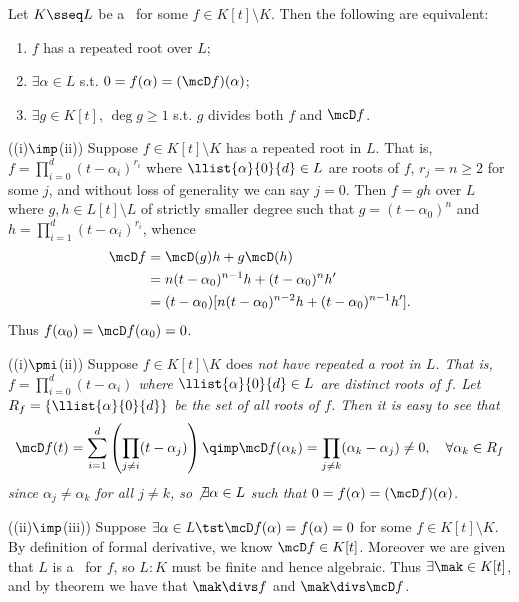 \documentclass{article}
\begin{document}
\setcounter{section}{8} %
\begin{exercise} %
  \label{qs:one}
  Let \( K\sseq L \) be a \sfe~for some \( f\in K[t]\setminus K \).
  Then the following are equivalent: \begin{enumerate}[label=(\roman*)]
    \item \( f \) has a repeated root over \( L \);
    \item \( \exists \alpha\in L \) s.t. \( 0=f(\alpha)=(\mcD f)(\alpha) \);
    \item \( \exists g\in K[t] \), \( \deg g \geq 1 \) s.t. \( g \) divides both \( f \) and \( \mcD f \).
  \end{enumerate}
\end{exercise}
\begin{solution}
((i)\( \imp \)(ii)) Suppose \( f \in K[t]\setminus K \) has a repeated root in \( L \).
That is, \( f = \prod_{i=0}^{d}(t-\alpha_i)^{r_i} \) where \( \llist{\alpha}{0}{d} \in L \) are roots of \( f \), \( r_j = n \geq 2 \) for some \( j \), and without loss of generality we can say \( j=0 \).
Then \( f=gh \) over \( L \) where \( g,h\in L[t]\setminus L \) of strictly smaller degree such that \( g=(t-\alpha_0)^n \) and \( h=\prod_{i=1}^{d}(t-\alpha_i)^{r_i} \), whence
\begin{align*}
\mcD f &= \mcD(g)h + g\mcD(h)\\
        &= n(t-\alpha_0)^{n-1}h + (t-\alpha_0)^{n}h' \\
        &= (t-\alpha_0)[n(t-\alpha_0)^{n-2}h + (t-\alpha_0)^{n-1}h'].
\end{align*}
Thus \( f(\alpha_0) = \mcD f(\alpha_0) = 0 \).

((i)\( \pmi \)(ii)) Suppose \( f \in K[t]\setminus K \) does \it{not} have repeated a root in \( L \).
That is, \( f = \prod_{i=0}^{d}(t-\alpha_i) \) where \( \llist{\alpha}{0}{d} \in L \) are distinct roots of \( f \).
Let \( R_f = \{\llist{\alpha}{0}{d}\} \) be the set of all roots of \( f \).
Then it is easy to see that \begin{align*}
  \mcD f(t) = \sum_{i=1}^{d}\left(\prod_{j\neq i} (t-\alpha_j)\right) \qimp \mcD f(\alpha_k) = \prod_{j\neq k} (\alpha_k-\alpha_j) \neq 0, \quad\forall \alpha_k\in R_f
\end{align*}
since \( \alpha_j\neq \alpha_k \) for all \( j\neq k \), so \( \not\exists \alpha\in L \) such that \( 0=f(\alpha)=(\mcD f)(\alpha) \).

((ii)\( \imp \)(iii)) Suppose \(\exists\alpha\in L \tst \mcD f(\alpha)=f(\alpha)=0 \) for some \( f\in K[t]\setminus K \).
By definition of formal derivative, we know \( \mcD f \in K[t] \).
Moreover we are given that \( L \) is a \sfe~for \( f \), so \( L:K \) must be finite and hence algebraic.
Thus \( \exists\mak\in K[t] \), and by theorem we have that \( \mak\divs f \) and \( \mak \divs \mcD f \).


\end{solution}
\end{document}

